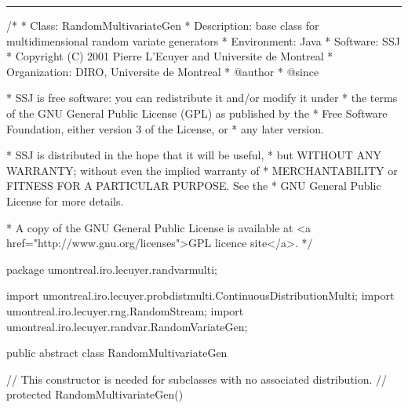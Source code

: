 \bigskip\hrule
\begin{code}
\begin{hide}
/*
 * Class:        RandomMultivariateGen
 * Description:  base class for multidimensional random variate generators
 * Environment:  Java
 * Software:     SSJ 
 * Copyright (C) 2001  Pierre L'Ecuyer and Universite de Montreal
 * Organization: DIRO, Universite de Montreal
 * @author       
 * @since

 * SSJ is free software: you can redistribute it and/or modify it under
 * the terms of the GNU General Public License (GPL) as published by the
 * Free Software Foundation, either version 3 of the License, or
 * any later version.

 * SSJ is distributed in the hope that it will be useful,
 * but WITHOUT ANY WARRANTY; without even the implied warranty of
 * MERCHANTABILITY or FITNESS FOR A PARTICULAR PURPOSE.  See the
 * GNU General Public License for more details.

 * A copy of the GNU General Public License is available at
   <a href="http://www.gnu.org/licenses">GPL licence site</a>.
 */
\end{hide}
package umontreal.iro.lecuyer.randvarmulti;\begin{hide}

import umontreal.iro.lecuyer.probdistmulti.ContinuousDistributionMulti;
import umontreal.iro.lecuyer.rng.RandomStream;
import umontreal.iro.lecuyer.randvar.RandomVariateGen;
\end{hide}


public abstract class RandomMultivariateGen \begin{hide} {
   protected int dimension;
   // Careful here: there is also a RandomStream inside gen1. But only one
   // of these two is used in a given class.
   protected RandomStream stream;  // stream used to generate random numbers
   protected RandomVariateGen gen1; // 1-dim generator used to generate random variates
\end{hide}\end{code}

\begin{hide}\begin{code}
// This constructor is needed for subclasses with no associated distribution.
//   protected RandomMultivariateGen() {}
\end{code}\end{hide}


